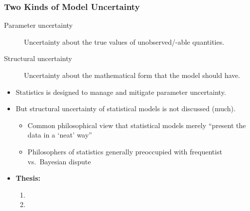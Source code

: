 \documentclass{philslides}
\begin{document}
\frame
{
	\frametitle{Two Kinds of Model Uncertainty}
	\begin{description}
		\item[Parameter uncertainty] Uncertainty about the true values of unobserved/-able quantities.  
		\item[Structural uncertainty] Uncertainty about the mathematical form that the model should have.  \autocite[265]{Parker2010}
	\end{description}
	\pause
	\begin{itemize}
		\item Statistics is designed to manage and mitigate parameter uncertainty.  
		\pause
		\item But structural uncertainty of statistical models is not discussed (much).
			\begin{itemize}
			\scriptsize
			\item Common philosophical view that statistical models merely ``present the data in a `neat' way'' \autocite[\S 1.2]{Frigg2017}
			\item Philosophers of statistics generally preoccupied with frequentist vs.~Bayesian dispute
			\end{itemize}
		\pause
		\item \textbf{Thesis:} 
			\begin{enumerate}
			\item {}
			\item {}
			\end{enumerate}
	\end{itemize}
}
\end{document}
